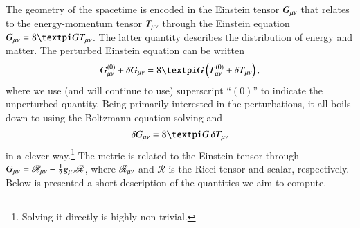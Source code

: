 


The geometry of the spacetime is encoded in the Einstein tensor $G_{\mu \nu}$ that relates to the energy-momentum tensor $T_{\mu \nu}$ through the Einstein equation $G\munu = 8\pi G T\munu$. The latter quantity describes the distribution of energy and matter. The perturbed Einstein equation can be written
\begin{equation}
    G^{(0)}\munu +\delta G\munu = 8\pi G \left( T^{(0)}\munu+\delta T_{\mu \nu} \right),
\end{equation}
where we use (and will continue to use) superscript ``$(0)$'' to indicate the unperturbed quantity. Being primarily interested in the perturbations, it all boils down to using the Boltzmann equation solving and
\begin{equation}\label{mil3:theo:eq:delta_G}
    \delta G\munu = 8\pi G\, \delta T\munu
\end{equation}
in a clever way.\footnote{Solving it directly is highly non-trivial.} The metric is related to the Einstein tensor through $G_{\mu \nu}= \mathscr{R}_{\mu \nu} - \frac{1}{2}g_{\mu \nu} \mathscr{R}$, where $\mathscr{R}_{\mu \nu}$ and $\mathscr{R}$ is the Ricci tensor and scalar, respectively. 
Below is presented a short description of the quantities we aim to compute. 
